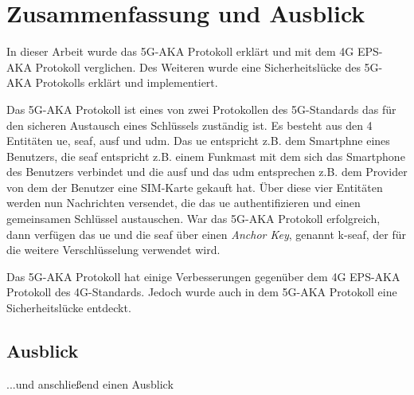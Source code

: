 \chapter{Zusammenfassung und Ausblick}
\label{chap:6}

In dieser Arbeit wurde das 5G-AKA Protokoll erklärt und mit dem 4G EPS-AKA Protokoll verglichen.
Des Weiteren wurde eine Sicherheitslücke des 5G-AKA Protokolls erklärt und implementiert.

Das 5G-AKA Protokoll ist eines von zwei Protokollen des 5G-Standards das für den sicheren Austausch eines Schlüssels zuständig ist.
Es besteht aus den 4 Entitäten \gls{ue}, \gls{seaf}, \gls{ausf} und \gls{udm}.
Das \gls{ue} entspricht z.B. dem Smartphne eines Benutzers, die \gls{seaf} entspricht z.B. einem Funkmast mit dem sich das Smartphone des Benutzers verbindet und die \gls{ausf} und das \gls{udm} entsprechen z.B. dem Provider von dem der Benutzer eine SIM-Karte gekauft hat.
Über diese vier Entitäten werden nun Nachrichten versendet, die das \gls{ue} authentifizieren und einen gemeinsamen Schlüssel austauschen.
War das 5G-AKA Protokoll erfolgreich, dann verfügen das \gls{ue} und die \gls{seaf} über einen \textit{Anchor Key}, genannt \gls{k-seaf}, der für die weitere Verschlüsselung verwendet wird.

Das 5G-AKA Protokoll hat einige Verbesserungen gegenüber dem 4G EPS-AKA Protokoll des 4G-Standards.
Jedoch wurde auch in dem 5G-AKA Protokoll eine Sicherheitslücke entdeckt.


\section*{Ausblick}
...und anschließend einen Ausblick